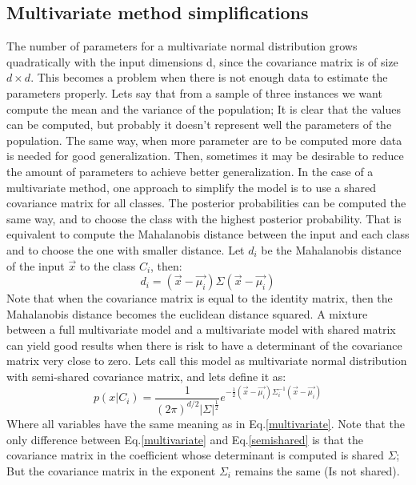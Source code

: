 \documentclass[10pt,journal]{IEEEtran}
\begin{document}
	\subsection{Multivariate method simplifications}
	The number of parameters for a multivariate normal distribution grows quadratically with the input 
	dimensions d, since the covariance matrix is of size $d \times d$. This becomes a problem when 
	there is not enough data to estimate the parameters properly. 
	Lets say that from a sample	of three instances we want compute the mean and the variance 
	of the population; It is clear that	the values can be computed, but probably it doesn't 
	represent well the parameters of the population. The same way, when more parameter are to
	be computed more data is needed for good generalization.\newline
	Then, sometimes it may be desirable to reduce the amount of parameters to achieve better
	generalization. In the case of a multivariate method, one approach to simplify the model
	is to use a shared covariance matrix for all classes. The posterior probabilities can be
	computed the same way, and to choose the class with the highest posterior probability. That
	is equivalent to compute the Mahalanobis distance between the input and each class and
	to choose the one with smaller distance. Let $d_i$ be the Mahalanobis distance of 
	the input $\vec{x}$ to the class $C_i$, then:
	\[ d_i = (\vec{x}-\vec{\mu_i})\Sigma(\vec{x}-\vec{\mu_i}) \]
	Note that when the covariance matrix is equal to the identity matrix, then the Mahalanobis
	distance becomes the euclidean distance squared.\newline
	A mixture between a full multivariate model and a multivariate model with shared matrix can
	yield good results when there is risk to have a determinant of the covariance matrix very
	close to zero. Lets call this model as multivariate normal distribution with semi-shared
	covariance matrix, and lets define it as:
	\begin{equation}\label{semishared}
		p(x|C_i) = \frac{1}{(2\pi)^{d/2}|\Sigma|^\frac{1}{2}} e^{-\frac{1}{2}(\vec{x}-\vec{\mu_i})\Sigma_i^{-1}(\vec{x}-\vec{\mu_i})}
	\end{equation}
	Where all variables have the same meaning as in Eq.\eqref{multivariate}. Note that the only
	difference between Eq.\eqref{multivariate} and Eq.\eqref{semishared} is that the covariance
	matrix in the coefficient whose determinant is computed is shared $\Sigma$; But the
	covariance matrix in the exponent $\Sigma_i$ remains the same (Is not shared).
	
\end{document}
